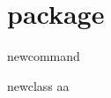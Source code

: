 \documentclass{ltugboat}
\newcommand{\intex}{\usebox\intexbox}
\begin{document}
\section{\intex\space package}
\begin{labeling}{newcommand}
\item [newclass] aa
\end{labeling}


\nocite{book-minimal}      %

\makesignature
\end{document}
